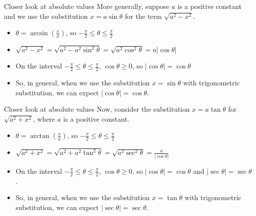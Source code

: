 \begin{frame}[t]{Closer look at absolute values\hfill \hyperlink{EndOfAbsValueDiscussion}{}}
More generally, suppose $a$ is a positive constant and we use the substitution $x= a \sin \theta$ for the term $\sqrt{a^2-x^2}$.\pause
\begin{itemize}[<+-|handout:0>]\color{spoilercolor}
\item $\theta = \arcsin\left(\frac{x}{a}\right)$, so $-\frac{\pi}{2}\le \theta \le \frac{\pi}{2}$
\item $\sqrt{a^2-x^2}=\sqrt{a^2-a^2\sin^2\theta}=\sqrt{a^2\cos^2\theta}=a|\cos\theta|$
\item On the interval $-\frac{\pi}{2} \le \theta \le \frac{\pi}{2}$, $\cos\theta \ge 0$, so $|\cos \theta|=\cos\theta$
\begin{center}
\end{center}
\item So, in general, when we use the substitution $x=\sin\theta$ with trigonometric substitution, we can expect $|\cos \theta| = \cos \theta$.
\end{itemize}
\end{frame}	
\begin{frame}[t]{Closer look at absolute values\hfill \hyperlink{EndOfAbsValueDiscussion}{}}
Now, consider the substitution $x=a\tan \theta$ for $\sqrt{a^2+x^2}$, where $a$ is a positive constant.\pause
\begin{itemize}[<+-|handout:0>]\color{spoilercolor}
\item $\theta = \arctan\left(\frac{x}{a}\right)$, so $-\frac{\pi}{2}\le \theta \le \frac{\pi}{2}$
\item $\sqrt{a^2+x^2}=\sqrt{a^2+a^2\tan^2\theta}=\sqrt{a^2\sec^2\theta}=\frac{a}{|\cos \theta|}$
\item On the interval $-\frac{\pi}{2} \le \theta \le \frac{\pi}{2}$, $\cos\theta \ge 0$, so $|\cos \theta|=\cos\theta$ and $|\sec \theta| = \sec \theta$.
\begin{center}
\end{center}
\item So, in general, when we use the substitution $x=\tan\theta$ with trigonometric substitution, we can expect $|\sec \theta| = \sec \theta$.
\end{itemize}
\end{frame}
